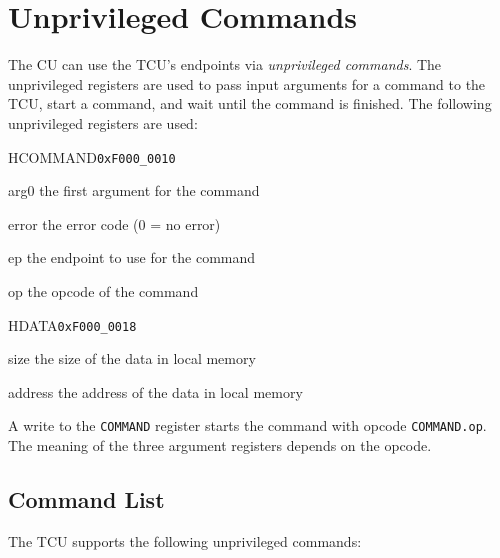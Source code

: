 \documentclass[a4paper,11pt,draft]{article}
\begin{document}
\section{Unprivileged Commands}

The CU can use the TCU's endpoints via \emph{unprivileged commands}. The unprivileged registers are
used to pass input arguments for a command to the TCU, start a command, and wait until the command
is finished. The following unprivileged registers are used:

\begin{register}{H}{COMMAND}{\texttt{0xF000\_0010}}
  \regnewline%
  \begin{regdesc}\begin{reglist}
    \item[arg0] the first argument for the command
    \item[error] the error code (0 = no error)
    \item[ep] the endpoint to use for the command
    \item[op] the opcode of the command
  \end{reglist}\end{regdesc}
\end{register}

\begin{register}{H}{DATA}{\texttt{0xF000\_0018}}
  \regnewline%
  \begin{regdesc}\begin{reglist}
    \item[size] the size of the data in local memory
    \item[address] the address of the data in local memory
  \end{reglist}\end{regdesc}
\end{register}

\noindent A write to the \texttt{COMMAND} register starts the command with opcode
\texttt{COMMAND.op}. The meaning of the three argument registers depends on the opcode.

\subsection{Command List}

The TCU supports the following unprivileged commands:
\end{document}
